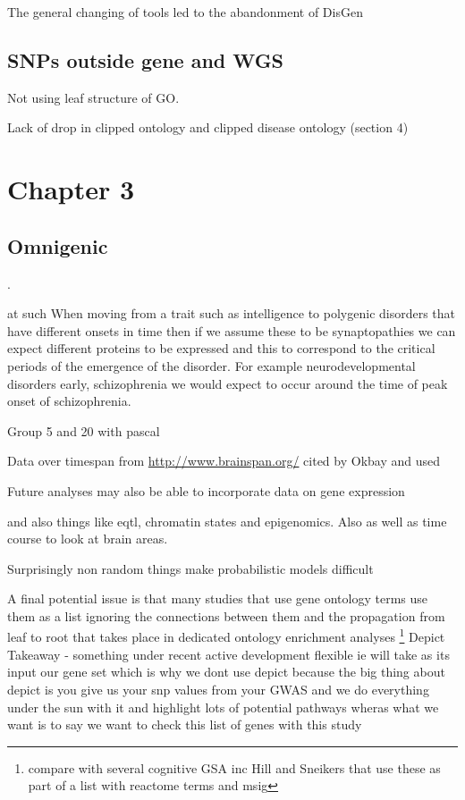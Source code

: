 The general changing of tools led to the abandonment of DisGen




  \subsection{SNPs outside gene and WGS}
 
 Not using leaf structure of GO. 
 
 Lack of drop in clipped ontology and clipped disease ontology (section 4)
\section{Chapter 3}
\subsection{Omnigenic}


.

at such When moving from a trait such as intelligence to polygenic disorders that have different onsets in time then if we assume these to be synaptopathies we can expect different proteins to be expressed and this to correspond to the critical periods of the emergence of the disorder. For example neurodevelopmental disorders early, schizophrenia we would expect to occur around the time of peak onset of schizophrenia.




Group 5 and 20 with pascal 


Data over timespan from \url{http://www.brainspan.org/} cited by Okbay and used 

Future analyses may also be able to incorporate data on gene expression

and also things like eqtl, chromatin states and epigenomics. Also as well as time course to look at brain areas. 

Surprisingly non random things make probabilistic models difficult


 A final potential issue is that many studies that use gene ontology terms use them as a list ignoring the connections between them and the propagation from leaf to root that takes place in dedicated ontology enrichment analyses \cite{rhee2008use}\cite{mi2019protocol} \footnote{compare with several cognitive GSA inc Hill and Sneikers that use these as part of a list with reactome terms and msig}
 Depict
Takeaway - something under recent active development flexible ie will take as its input our gene set which is why we dont use depict because the big thing about depict is you give us your snp values from your GWAS and we do everything under the sun with it and highlight lots of potential pathways wheras what we want is to say we want to check this list of genes with this study 

